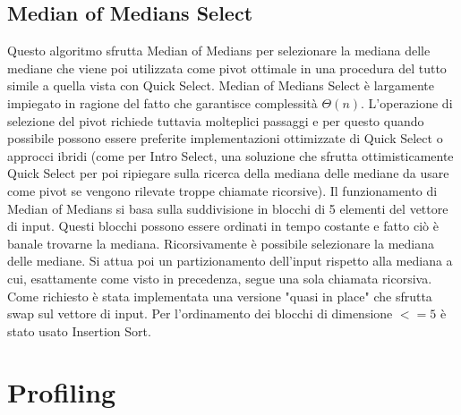 \documentclass{article}
\begin{document}
\subsection{Median of Medians Select}
Questo algoritmo sfrutta Median of Medians per selezionare la mediana delle mediane che viene poi utilizzata come pivot ottimale in una procedura del tutto simile a quella vista con Quick Select.
\newline
\newline
Median of Medians Select è largamente impiegato in ragione del fatto che garantisce complessità $\Theta(n)$.
\newline
L'operazione di selezione del pivot richiede tuttavia molteplici passaggi e per questo quando possibile possono essere preferite implementazioni ottimizzate di Quick Select o approcci ibridi (come per Intro Select, una soluzione che sfrutta ottimisticamente Quick Select per poi ripiegare sulla ricerca della mediana delle mediane da usare come pivot se vengono rilevate troppe chiamate ricorsive).
\newline
\newline
Il funzionamento di Median of Medians si basa sulla suddivisione in blocchi di 5 elementi del vettore di input.
\newline
Questi blocchi possono essere ordinati in tempo costante e fatto ciò è banale trovarne la mediana. 
\newline
Ricorsivamente è possibile selezionare la mediana delle mediane.
\newline
Si attua poi un partizionamento dell'input rispetto alla mediana a cui, esattamente come visto in precedenza, segue una sola chiamata ricorsiva.
\newline
\newline
Come richiesto è stata implementata una versione "quasi in place" che sfrutta swap sul vettore di input.
\newline
Per l'ordinamento dei blocchi di dimensione $<= 5$ è stato usato Insertion Sort.
\newpage

\section{Profiling}
\end{document}
